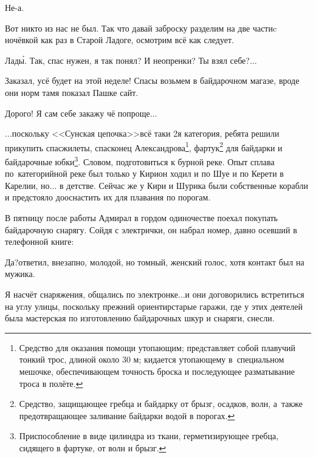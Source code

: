 \diagdash Не-а.

\diagdash Вот никто из нас не был. Так что давай заброску разделим на две части\mdash c ночёвкой как раз в Старой Ладоге, осмотрим всё как следует.

\diagdash Лад\'{ы}. Так, спас нужен, я так понял? И неопренки? Ты взял себе?$\ldots$

\diagdash Заказал, усё будет на этой неделе! Спасы возьмем в байдарочном магазе, вроде они норм там\mdash я показал Пашке сайт.

\diagdash Дорого! Я сам себе закажу чё попроще$\ldots$



\newpage
\renewcommand*{\thefootnote}{\arabic{footnote}}
$\ldots$поскольку <<Сунская цепочка>>\mdash всё таки 2\sdash я категория, ребята решили прикупить спасжилеты, спасконец Александрова\footnote[1]{Средство для оказания помощи утопающим; представляет собой плавучий тонкий трос, длиной около 30 м; кидается утопающему в~специальном мешочке, обеспечивающем точность броска и последующее разматывание троса в полёте.}, фартук\footnote[2]{Средство, защищающее гребца и байдарку от брызг, осадков, волн, а~также предотвращающее заливание байдарки водой в порогах.} для байдарки и байдарочные юбки\footnote[3]{Приспособление в виде цилиндра из ткани, герметизирующее гребца, сидящего в фартуке, от волн и брызг.}. Словом, подготовиться к бурной реке. Опыт сплава по~категорийной реке был только у Кири\mdash он ходил и по Шуе и по Керети в Карелии, но$\ldots$ в детстве. Сейчас же у Кири и Шурика были собственные корабли и предстояло дооснастить их для плавания по порогам. 

В пятницу после работы Адмирал в гордом одиночестве поехал покупать байдарочную снарягу. Сойдя с электрички, он набрал номер, давно осевший в телефонной книге:

\diagdash Да?\mdash ответил, внезапно, молодой, но томный, женский голос, хотя контакт был на мужика.

\diagdash Я насчёт снаряжения, общались по электронке$\ldots$\mdash и они договорились встретиться на углу улицы, поскольку прежний ориентир\mdash старые гаражи, где у этих деятелей была мастерская по изготовлению байдарочных шкур и снаряги, снесли.

